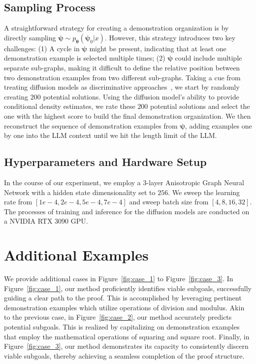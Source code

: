 \documentclass{article}
\begin{document}
\subsection{Sampling Process}
A straightforward strategy for creating a demonstration organization is by directly sampling $\boldsymbol{\psi} \sim p_{\boldsymbol{\theta}}(\boldsymbol{\psi}_0|x)$. However, this strategy introduces two key challenges: (1) A cycle in $\boldsymbol{\psi}$ might be present, indicating that at least one demonstration example is selected multiple times; (2) $\boldsymbol{\psi}$ could include multiple separate sub-graphs, making it difficult to define the relative position between two demonstration examples from two different sub-graphs. Taking a cue from treating diffusion models as discriminative approaches~\cite{li2023your}, we start by randomly creating $200$ potential solutions. Using the diffusion model's ability to provide conditional density estimates, we rate these $200$ potential solutions and select the one with the highest score to build the final demonstration organization. We then reconstruct the sequence of demonstration examples from $\boldsymbol{\psi}$, adding examples one by one into the LLM context until we hit the length limit of the LLM.

\subsection{Hyperparameters and Hardware Setup}

In the course of our experiment, we employ a $3$-layer Anisotropic Graph Neural Network with a hidden state dimensionality set to $256$.  We sweep the learning rate from $[1e-4, 2e-4, 5e-4, 7e-4]$ and sweep batch size from $[4, 8, 16, 32]$. The processes of training and inference for the diffusion models are conducted on a NVIDIA RTX 3090 GPU.





\section{Additional Examples}
\label{sec:appendix_case}
We provide additional cases in Figure~\ref{fig:case_1} to Figure~\ref{fig:case_3}. 
In Figure~\ref{fig:case_1}, our method proficiently identifies viable subgoals, successfully guiding a clear path to the proof. This is accomplished by leveraging pertinent demonstration examples which utilize operations of division and modulus. Akin to the previous case, in Figure~\ref{fig:case_2}, our method accurately predicts potential subgoals. This is realized by capitalizing on demonstration examples that employ the mathematical operations of squaring and square root. Finally, in Figure~\ref{fig:case_3}, our method demonstrates its capacity to consistently discern viable subgoals, thereby achieving a seamless completion of the proof structure. 
\end{document}
